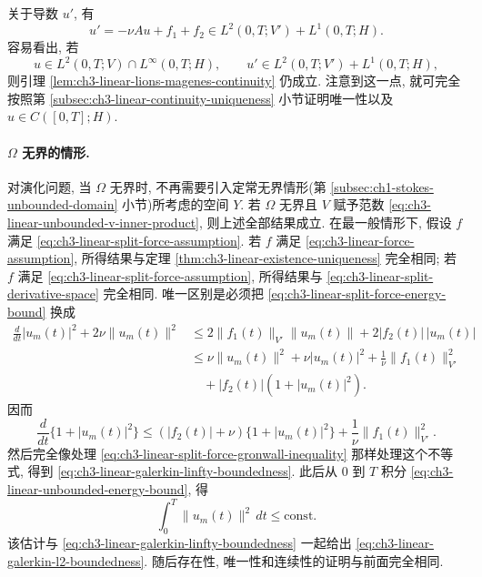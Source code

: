 关于导数 $u'$, 有
\begin{equation}
u'=-\nu Au+f_1+f_2
\in L^2(0,T;V')+L^1(0,T;H).
\label{eq:ch3-linear-split-force-derivative}
\end{equation}
容易看出, 若
\begin{equation}
u\in L^2(0,T;V)\cap L^\infty(0,T;H),
\qquad
u'\in L^2(0,T;V')+L^1(0,T;H),
\label{eq:ch3-linear-extended-continuity-assumptions}
\end{equation}
则引理 \ref{lem:ch3-linear-lions-magenes-continuity} 仍成立. 注意到这一点, 就可完全按照第 \ref{subsec:ch3-linear-continuity-uniqueness} 小节证明唯一性以及 $u\in C([0,T];H)$.

\hypertarget{chapter-03-page-195}{}
\paragraph{$\Omega$ 无界的情形.}
对演化问题, 当 $\Omega$ 无界时, 不再需要引入定常无界情形(第 \ref{subsec:ch1-stokes-unbounded-domain} 小节)所考虑的空间 $Y$. 若 $\Omega$ 无界且 $V$ 赋予范数 \eqref{eq:ch3-linear-unbounded-v-inner-product}, 则上述全部结果成立. 在最一般情形下, 假设 $f$ 满足 \eqref{eq:ch3-linear-split-force-assumption}. 若 $f$ 满足 \eqref{eq:ch3-linear-force-assumption}, 所得结果与定理 \ref{thm:ch3-linear-existence-uniqueness} 完全相同; 若 $f$ 满足 \eqref{eq:ch3-linear-split-force-assumption}, 所得结果与 \eqref{eq:ch3-linear-split-derivative-space} 完全相同. 唯一区别是必须把 \eqref{eq:ch3-linear-split-force-energy-bound} 换成
\begin{equation}
\begin{aligned}
\frac d{dt}|u_m(t)|^2+2\nu\lVert u_m(t)\rVert^2
&\leq2\lVert f_1(t)\rVert_{V'}\lVert u_m(t)\rVert
+2|f_2(t)|\,|u_m(t)|\\
&\leq\nu\lVert u_m(t)\rVert^2+\nu|u_m(t)|^2
+\frac1\nu\lVert f_1(t)\rVert_{V'}^2\\
&\quad+|f_2(t)|(1+|u_m(t)|^2).
\end{aligned}
\label{eq:ch3-linear-unbounded-energy-bound}
\end{equation}
因而
\begin{equation}
\frac d{dt}\{1+|u_m(t)|^2\}
\leq(|f_2(t)|+\nu)\{1+|u_m(t)|^2\}
+\frac1\nu\lVert f_1(t)\rVert_{V'}^2.
\label{eq:ch3-linear-unbounded-gronwall-inequality}
\end{equation}
然后完全像处理 \eqref{eq:ch3-linear-split-force-gronwall-inequality} 那样处理这个不等式, 得到 \eqref{eq:ch3-linear-galerkin-linfty-boundedness}. 此后从 $0$ 到 $T$ 积分 \eqref{eq:ch3-linear-unbounded-energy-bound}, 得
\[
\int_0^T\lVert u_m(t)\rVert^2\,dt\leq\mathrm{const}.
\]
该估计与 \eqref{eq:ch3-linear-galerkin-linfty-boundedness} 一起给出 \eqref{eq:ch3-linear-galerkin-l2-boundedness}. 随后存在性, 唯一性和连续性的证明与前面完全相同.

